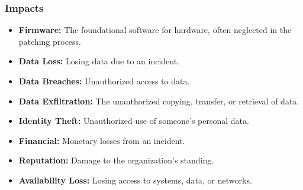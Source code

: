 \begin{fullwidth}
    \subsubsection*{\color{red}Impacts}
    \begin{itemize}
        \item \textbf{Firmware:} The foundational software for hardware, often neglected in the patching process.
        \item \textbf{Data Loss:} Losing data due to an incident.
        \item \textbf{Data Breaches:} Unauthorized access to data.
        \item \textbf{Data Exfiltration:} The unauthorized copying, transfer, or retrieval of data.
        \item \textbf{Identity Theft:} Unauthorized use of someone’s personal data.
        \item \textbf{Financial:} Monetary losses from an incident.
        \item \textbf{Reputation:} Damage to the organization’s standing.
        \item \textbf{Availability Loss:} Losing access to systems, data, or networks.
    \end{itemize}
\end{fullwidth}
\newpage